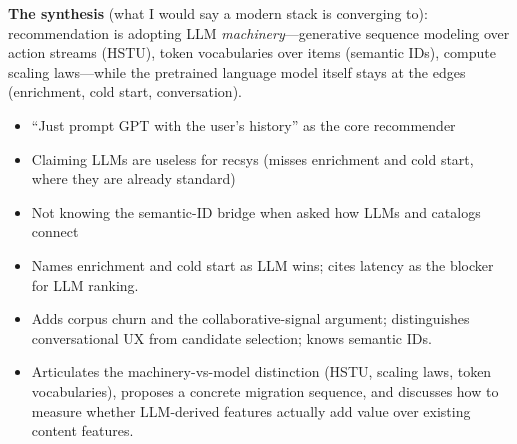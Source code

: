 \begin{interviewq}
\textbf{The synthesis} (what I would say a modern stack is converging to): recommendation is adopting LLM \textit{machinery}---generative sequence modeling over action streams (HSTU), token vocabularies over items (semantic IDs), compute scaling laws---while the pretrained language model itself stays at the edges (enrichment, cold start, conversation).

\redflags
\begin{itemize}
    \item ``Just prompt GPT with the user's history'' as the core recommender
    \item Claiming LLMs are useless for recsys (misses enrichment and cold start, where they are already standard)
    \item Not knowing the semantic-ID bridge when asked how LLMs and catalogs connect
\end{itemize}


\goodgreat
\begin{itemize}
    \item {} Names enrichment and cold start as LLM wins; cites latency as the blocker for LLM ranking.
    \item {} Adds corpus churn and the collaborative-signal argument; distinguishes conversational UX from candidate selection; knows semantic IDs.
    \item {} Articulates the machinery-vs-model distinction (HSTU, scaling laws, token vocabularies), proposes a concrete migration sequence, and discusses how to measure whether LLM-derived features actually add value over existing content features.
\end{itemize}

\end{interviewq}
